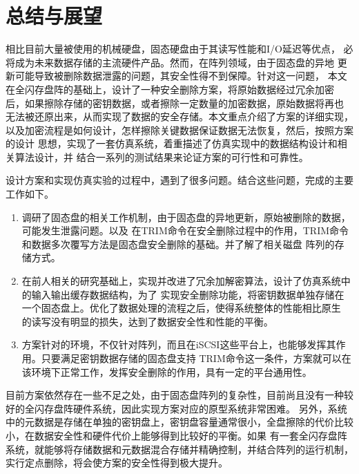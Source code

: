 \chapter{总结与展望}
相比目前大量被使用的机械硬盘，固态硬盘由于其读写性能和I/O延迟等优点，
必将成为未来数据存储的主流硬件产品。然而，在阵列领域，由于固态盘的异地
更新可能导致被删除数据泄露的问题，其安全性得不到保障。针对这一问题，
本文在全闪存盘阵的基础上，设计了一种安全删除方案，将原始数据经过冗余加密
后，如果擦除存储的密钥数据，或者擦除一定数量的加密数据，原始数据将再也
无法被还原出来，从而实现了数据的安全存储。本文重点介绍了方案的详细实现，
以及加密流程是如何设计，怎样擦除关键数据保证数据无法恢复，然后，按照方案的设计
思想，实现了一套仿真系统，着重描述了仿真实现中的数据结构设计和相关算法设计，并
结合一系列的测试结果来论证方案的可行性和可靠性。


设计方案和实现仿真实验的过程中，遇到了很多问题。结合这些问题，完成的主要工作如下。
\begin{enumerate}
        \item 调研了固态盘的相关工作机制，由于固态盘的异地更新，原始被删除的数据，可能发生泄露问题。以及
        在TRIM命令在安全删除过程中的作用，TRIM命令和数据多次覆写方法是固态盘安全删除的基础。并了解了相关磁盘
        阵列的存储方式。
        \item 在前人相关的研究基础上，实现并改进了冗余加解密算法，设计了仿真系统中的输入输出缓存数据结构，为了
        实现安全删除功能，将密钥数据单独存储在一个固态盘上。优化了数据处理的流程之后，使得系统整体的性能相比原生
        的读写没有明显的损失，达到了数据安全性和性能的平衡。
        \item 方案针对的环境，不仅针对阵列，而且在iSCSI这些平台上，也能够发挥其作用。只要满足密钥数据存储的固态盘支持
        TRIM命令这一条件，方案就可以在该环境下正常工作，发挥安全删除的作用，具有一定的平台通用性。
\end{enumerate}


目前方案依然存在一些不足之处，由于固态盘阵列的复杂性，目前尚且没有一种较好的全闪存盘阵硬件系统，因此实现方案对应的原型系统非常困难。
另外，系统中的元数据是存储在单独的密钥盘上，密钥盘容量通常很小，全盘擦除的代价比较小，在数据安全性和硬件代价上能够得到比较好的平衡。如果
有一套全闪存盘阵系统，就能够将存储数据和元数据混合存储并精确控制，并结合阵列的运行机制，实行定点删除，将会使方案的安全性得到极大提升。
